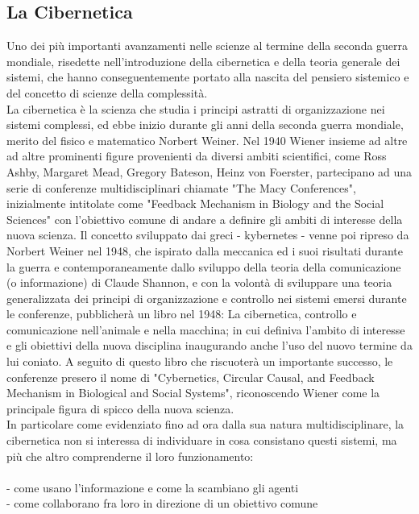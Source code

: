 \subsection{La Cibernetica}
\label{sec:La Cibernetica}
Uno dei più importanti avanzamenti nelle scienze
al termine della seconda guerra mondiale, risedette nell'introduzione della
cibernetica e della teoria generale dei sistemi, che hanno conseguentemente
portato alla nascita del pensiero sistemico e del concetto
di scienze della complessità. \\
La cibernetica è la scienza che studia i principi astratti di organizzazione
nei sistemi complessi, ed ebbe inizio durante gli anni della seconda guerra
mondiale, merito del fisico e matematico Norbert Weiner.
Nel 1940 Wiener insieme ad altre ad altre prominenti figure provenienti
da diversi ambiti scientifici,
come Ross Ashby, Margaret Mead, Gregory Bateson, Heinz von Foerster,
partecipano ad una serie di conferenze
multidisciplinari chiamate "The Macy Conferences", inizialmente intitolate come
"Feedback Mechanism in Biology and the Social Sciences"
con l'obiettivo comune di andare a definire
gli ambiti di interesse della nuova scienza.
Il concetto sviluppato dai greci - kybernetes -
venne poi ripreso da Norbert Weiner nel 1948,
che ispirato dalla meccanica ed i suoi risultati durante la guerra
e contemporaneamente dallo sviluppo della teoria della comunicazione
(o informazione) di Claude Shannon,
e con la volontà di sviluppare una teoria generalizzata dei principi di
organizzazione e controllo nei sistemi emersi durante le conferenze,
pubblicherà un libro nel 1948:
La cibernetica, controllo e comunicazione nell'animale e nella macchina;
in cui definiva l'ambito di interesse e gli obiettivi della nuova disciplina
inaugurando anche l'uso del nuovo termine da lui coniato.
A seguito di questo libro che riscuoterà
un importante successo, le conferenze presero il nome di
"Cybernetics, Circular Causal, and Feedback Mechanism in Biological and Social Systems",
riconoscendo Wiener come la principale figura di spicco della nuova scienza. \\
In particolare come evidenziato fino ad ora dalla sua natura multidisciplinare,
la cibernetica non si interessa di individuare in cosa consistano questi sistemi,
ma più che altro comprenderne il loro funzionamento:
\\ \\
- come usano l'informazione e come la scambiano gli agenti
\\
- come collaborano fra loro in direzione di un obiettivo comune
